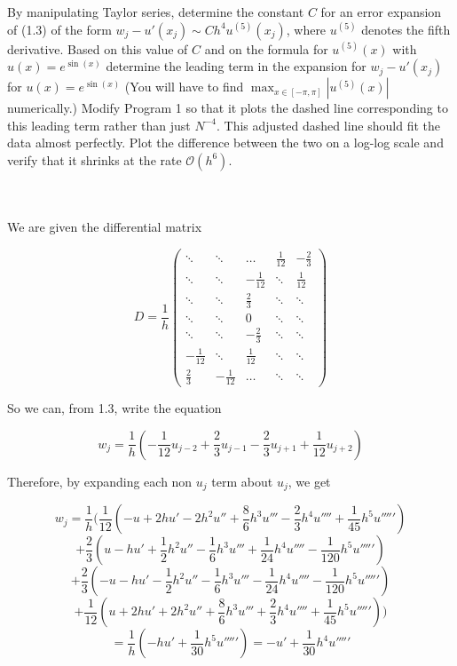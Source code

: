 By manipulating Taylor series, determine the constant $C$ for an error expansion of (1.3) of the
form $w_j-u'(x_j)\sim Ch^4u^{(5)}(x_j)$, where $u^{(5)}$ denotes the fifth derivative. Based on this
value of $C$ and on the formula for $u^{(5)}(x)$ with $u(x)=e^{\sin(x)}$ determine the leading term in
the expansion for $w_j-u'(x_j)$ for $u(x)=e^{\sin(x)}$ (You will have to find
$\max_{x\in[-\pi,\pi]}|u^{(5)}(x)|$ numerically.) Modify Program 1 so that it plots the dashed line
corresponding to this leading term rather than just $N^{-4}$. This adjusted dashed line should fit the
data almost perfectly. Plot the difference between the two on a log-log scale and verify that it shrinks
at the rate $\mathcal{O}(h^6)$.\\\\

\begin{solution}\renewcommand{\qedsymbol}{}\ \\
    We are given the differential matrix

    $$D=\frac{1}{h}\left(\begin{array}{ccccc} \ddots & \ddots & \dots & \frac{1}{12} & -\frac23
                                           \\ \ddots & \ddots & -\frac{1}{12} & \ddots & \frac{1}{12}
                                           \\ \ddots & \ddots & \frac23 & \ddots & \ddots
                                           \\ \ddots & \ddots & 0 & \ddots & \ddots
                                           \\ \ddots & \ddots & -\frac23 & \ddots & \ddots
                                           \\ -\frac{1}{12} & \ddots & \frac{1}{12} & \ddots & \ddots
                                           \\ \frac23 & -\frac{1}{12} & \dots & \ddots & \ddots
                    \end{array}\right)$$

    So we can, from 1.3, write the equation

    $$w_j=\frac{1}{h}(-\frac{1}{12}u_{j-2}+\frac23u_{j-1}-\frac23u_{j+1}+\frac{1}{12}u_{j+2})$$
    
    Therefore, by expanding each non $u_j$ term about $u_j$, we get

    $$w_j=\frac{1}{h}(\frac{1}{12}(-u+2hu'-2h^2u''+\frac{8}{6}h^3u'''-\frac23h^4u''''+
    \frac{1}{45}h^5u''''')$$
    $$+\frac23(u-hu'+\frac12h^2u''-\frac16h^3u'''+\frac{1}{24}h^4u''''-\frac{1}{120}h^5u''''')$$
    $$+\frac23(-u-hu'-\frac12h^2u''-\frac16h^3u'''-\frac{1}{24}h^4u''''-\frac{1}{120}h^5u''''')$$
    $$+\frac{1}{12}(u+2hu'+2h^2u''+\frac86h^3u'''+\frac23h^4u''''+\frac{1}{45}h^5u'''''))$$
    $$=\frac1h(-hu'+\frac{1}{30}h^5u''''')=-u'+\frac{1}{30}h^4u'''''$$


\end{solution}
